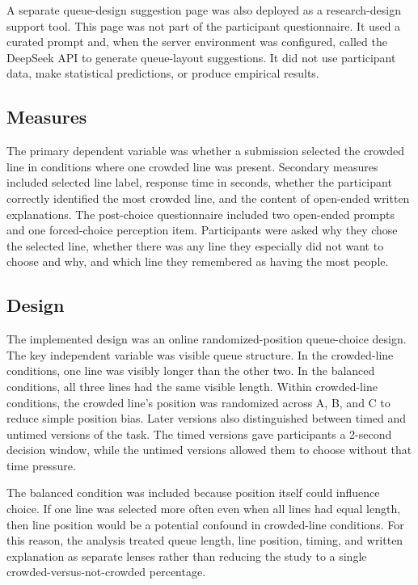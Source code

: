 \documentclass[stu,12pt,floatsintext]{apa7}
\begin{document}
A separate queue-design suggestion page was also deployed as a research-design support tool. This page was not part of the participant questionnaire. It used a curated prompt and, when the server environment was configured, called the DeepSeek API to generate queue-layout suggestions. It did not use participant data, make statistical predictions, or produce empirical results.

\subsection{Measures}

The primary dependent variable was whether a submission selected the crowded line in conditions where one crowded line was present. Secondary measures included selected line label, response time in seconds, whether the participant correctly identified the most crowded line, and the content of open-ended written explanations. The post-choice questionnaire included two open-ended prompts and one forced-choice perception item. Participants were asked why they chose the selected line, whether there was any line they especially did not want to choose and why, and which line they remembered as having the most people.

\subsection{Design}

The implemented design was an online randomized-position queue-choice design. The key independent variable was visible queue structure. In the crowded-line conditions, one line was visibly longer than the other two. In the balanced conditions, all three lines had the same visible length. Within crowded-line conditions, the crowded line's position was randomized across A, B, and C to reduce simple position bias. Later versions also distinguished between timed and untimed versions of the task. The timed versions gave participants a 2-second decision window, while the untimed versions allowed them to choose without that time pressure.

The balanced condition was included because position itself could influence choice. If one line was selected more often even when all lines had equal length, then line position would be a potential confound in crowded-line conditions. For this reason, the analysis treated queue length, line position, timing, and written explanation as separate lenses rather than reducing the study to a single crowded-versus-not-crowded percentage.
\end{document}
